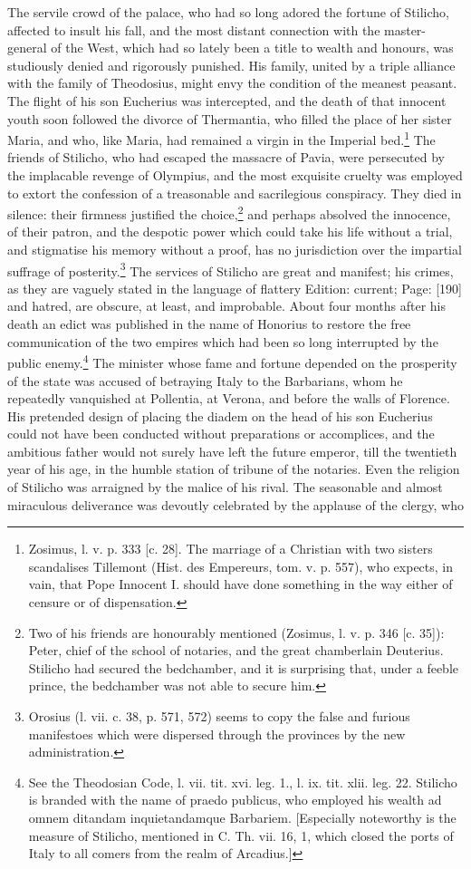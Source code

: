 The servile crowd of the palace, who had so long adored the fortune of Stilicho, affected to insult his fall, and the most distant connection with the master-general of the West, which had so lately been a title to wealth and honours, was studiously denied and rigorously punished. His family, united by a triple alliance with the family of Theodosius, might envy the condition of the meanest peasant. The flight of his son Eucherius was intercepted, and the death of that innocent youth soon followed the divorce of Thermantia, who filled the place of her sister Maria, and who, like Maria, had remained a virgin in the Imperial bed.\footnote{Zosimus, l. v. p. 333 [c. 28]. The marriage of a Christian with two sisters scandalises Tillemont (Hist. des Empereurs, tom. v. p. 557), who expects, in vain, that Pope Innocent I. should have done something in the way either of censure or of dispensation.} The friends of Stilicho, who had escaped the massacre of Pavia, were persecuted by the implacable revenge of Olympius, and the most exquisite cruelty was employed to extort the confession of a treasonable and sacrilegious conspiracy. They died in silence: their firmness justified the choice,\footnote{Two of his friends are honourably mentioned (Zosimus, l. v. p. 346 [c. 35]): Peter, chief of the school of notaries, and the great chamberlain Deuterius. Stilicho had secured the bedchamber, and it is surprising that, under a feeble prince, the bedchamber was not able to secure him.} and perhaps absolved the innocence, of their patron, and the despotic power which could take his life without a trial, and stigmatise his memory without a proof, has no jurisdiction over the impartial suffrage of posterity.\footnote{Orosius (l. vii. c. 38, p. 571, 572) seems to copy the false and furious manifestoes which were dispersed through the provinces by the new administration.} The services of Stilicho are great and manifest; his crimes, as they are vaguely stated in the language of flattery Edition: current; Page: [190] and hatred, are obscure, at least, and improbable. About four months after his death an edict was published in the name of Honorius to restore the free communication of the two empires which had been so long interrupted by the public enemy.\footnote{See the Theodosian Code, l. vii. tit. xvi. leg. 1., l. ix. tit. xlii. leg. 22. Stilicho is branded with the name of praedo publicus, who employed his wealth ad omnem ditandam inquietandamque Barbariem. [Especially noteworthy is the measure of Stilicho, mentioned in C. Th. vii. 16, 1, which closed the ports of Italy to all comers from the realm of Arcadius.]} The minister whose fame and fortune depended on the prosperity of the state was accused of betraying Italy to the Barbarians, whom he repeatedly vanquished at Pollentia, at Verona, and before the walls of Florence. His pretended design of placing the diadem on the head of his son Eucherius could not have been conducted without preparations or accomplices, and the ambitious father would not surely have left the future emperor, till the twentieth year of his age, in the humble station of tribune of the notaries. Even the religion of Stilicho was arraigned by the malice of his rival. The seasonable and almost miraculous deliverance was devoutly celebrated by the applause of the clergy, who 